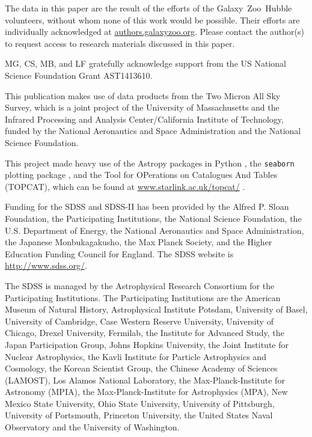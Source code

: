 \documentclass[useAMS,usenatbib]{mn2e}
\begin{document}
The data in this paper are the result of the efforts of the Galaxy~Zoo~Hubble volunteers, without whom none of this work would be possible. Their efforts are individually acknowledged at \url{authors.galaxyzoo.org}. Please contact the author(s) to request access to research materials discussed in this paper. 


MG, CS, MB, and LF gratefully acknowledge support from the US National
Science Foundation Grant AST1413610.

This publication makes use of data products from the Two Micron All Sky Survey, which is a joint project of the University of Massachusetts and the Infrared Processing and Analysis Center/California Institute of Technology, funded by the National Aeronautics and Space Administration and the National Science Foundation.

This project made heavy use of the Astropy packages in Python \citep{Robitaille2013}, the \texttt{seaborn} plotting package \citep{Waskom}, and the Tool for OPerations on Catalogues And Tables (TOPCAT), which can be found at \url{www.starlink.ac.uk/topcat/} \citep{Taylor2005}. 

Funding for the SDSS and SDSS-II has been provided by the Alfred P. Sloan
Foundation, the Participating Institutions, the National Science Foundation,
the U.S. Department of Energy, the National Aeronautics and Space
Administration, the Japanese Monbukagakusho, the Max Planck Society, and the
Higher Education Funding Council for England. The SDSS website is
\url{http://www.sdss.org/}. 

The SDSS is managed by the Astrophysical Research Consortium for the
Participating Institutions. The Participating Institutions are the American
Museum of Natural History, Astrophysical Institute Potsdam, University of
Basel, University of Cambridge, Case Western Reserve University, University of
Chicago, Drexel University, Fermilab, the Institute for Advanced Study, the
Japan Participation Group, Johns Hopkins University, the Joint Institute for
Nuclear Astrophysics, the Kavli Institute for Particle Astrophysics and
Cosmology, the Korean Scientist Group, the Chinese Academy of Sciences
(LAMOST), Los Alamos National Laboratory, the Max-Planck-Institute for
Astronomy (MPIA), the Max-Planck-Institute for Astrophysics (MPA), New Mexico
State University, Ohio State University, University of Pittsburgh, University
of Portsmouth, Princeton University, the United States Naval Observatory and
the University of Washington. 
\end{document}
